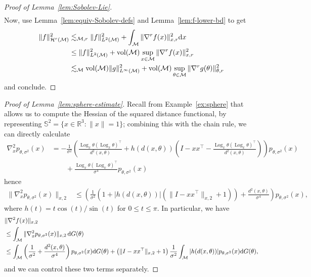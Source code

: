 \documentclass[preprint]{imsart}
\theoremstyle{plain}
\theoremstyle{definition}
\newcommand{\Rbb}{\mathbb{R}}
\newcommand{\Mcal}{\mathcal{M}}
\newcommand{\Hcal}{\mathcal{H}}
\newcommand{\diff}{\textnormal{d}}
\newcommand{\vol}{\textnormal{vol}}
\DeclareMathOperator{\Log}{Log}
\begin{document}
\begin{appendix}
\begin{proof}[Proof of Lemma~\ref{lem:Sobolev-Lie}]
\begin{align*}
    \end{align*}
    Now, use Lemma~\ref{lem:equiv-Sobolev-defs} and Lemma~\ref{lem:f-lower-bd} to get
    \begin{align*}
        \|f\|_{\Hcal^r(\Mcal)}^2 &\lesssim_{\Mcal,r}\|f\|^2_{L^2(\Mcal)}+\int_{\Mcal}\|\nabla^rf(x)\|^2_{x,r}\diff x \\
        &\le\|f\|_{L^2(\Mcal)}^2 + \vol(\Mcal)\sup_{x\in\Mcal}\|\nabla^rf(x)\|_{x,r}^2 \\
        &\lesssim_{\Mcal}\vol(\Mcal)\|g\|_{L^{\infty}(\Mcal)}^2 + \vol(\Mcal)\sup_{\theta\in\Mcal}\|\nabla^rg(\theta)\|_{\theta,r}^2
    \end{align*}
    and conclude.
\end{proof}

\begin{proof}[Proof of Lemma~\ref{lem:sphere-estimate}]
    Recall from Example~\ref{ex:sphere} that \cite{PennecHessian} allows us to compute the Hessian of the squared distance functional, by representing $\mathbb{S}^2 = \{x\in\Rbb^3:\|x\|=1\}$; combining this with the chain rule, we can directly calculate 
    \begin{align*}
        \nabla_x^2p_{\theta,\sigma^2}(x) &=-\frac{1}{\sigma^2}\left(\frac{\Log_x\theta (\Log_x\theta)^{\top}}{d^2(x,\theta)} + h(d(x,\theta))\left(I-xx^{\top}-\frac{\Log_x\theta (\Log_x\theta)^{\top}}{d^2(x,\theta)}\right)\right)p_{\theta,\sigma^2}(x) \\
        &\qquad+ \frac{\Log_x\theta(\Log_x\theta)^{\top}}{\sigma^4}p_{\theta,\sigma^2}(x)
    \end{align*}
    hence 
    \begin{align*}
        \|\nabla_x^2p_{\theta,\sigma^2}(x)\|_{x,2} &\le \left(\frac{1}{\sigma^2}\left(1+ |h(d(x,\theta))|\left(\|I-xx^{\top}\|_{x,2} + 1\right)\right)+\frac{d^2(x,\theta)}{\sigma^4}\right)p_{\theta,\sigma^2}(x),
    \end{align*}
    where $h(t) = t\cos(t)/\sin(t)$ for $0\le t\le \pi$.
    In particular, we have
    \begin{align*}
        &\|\nabla^2f(x)\|_{x,2} \\
        &\le\int_{\Mcal}\|\nabla_x^2p_{\theta,\sigma^2}(x)\|_{x,2} \,\diff G(\theta) \\
        &\le \int_{\Mcal}\left(\frac{1}{\sigma^2} +\frac{d^2(x,\theta)}{\sigma^4}\right)p_{\theta,\sigma^2}(x)\diff G(\theta) + \left(\|I-xx^{\top}\|_{x,2} + 1\right)\frac{1}{\sigma^2}\int_{\Mcal}|h(d(x,\theta))|p_{\theta,\sigma^2}(x)\diff G(\theta),
    \end{align*}
    and we can control these two terms separately.
    

\end{proof}
\end{appendix}
\end{document}
